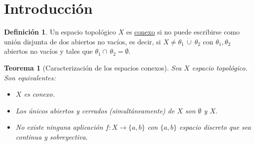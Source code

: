 \documentclass[12pt]{report}
\newtheorem{theorem}{Teorema}[chapter]
\theoremstyle{definition}
\newtheorem{definition}{Definición}[chapter]
\theoremstyle{definition}
\theoremstyle{remark}
\begin{document}
\section{Introducción}

\begin{definition}
Un espacio topológico $X$ es \underline{conexo} si no puede escribirse como unión disjunta de dos abiertos no vacíos, es decir, si $X \neq \theta_1 \, \dot\cup \ \theta_2$ con $\theta_1, \theta_2$ abiertos no vacíos y tales que $\theta_1 \cap \, \theta_2 = \emptyset$.
\end{definition}

\begin{theorem}[Caracterización de los espacios conexos]
\label{teo2.1.}
Sea $X$ espacio topológico. Son equivalentes:
\begin{itemize}
    \item[(i)] $X$ es conexo.
    \item[(ii)] Los únicos abiertos y cerrados (simultáneamente) de $X$ son $\emptyset$ y $X$.
    \item[(iii)] No existe ninguna aplicación $f \colon X \to \{a,b\}$ con $\{a,b\}$ espacio discreto que sea continua y sobreyectiva.
\end{itemize}
\end{theorem}
\end{document}
